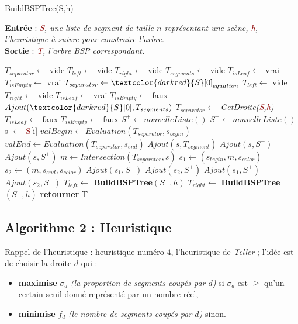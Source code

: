 \documentclass{article}
\newcommand{\red}[1]{\textcolor{darkred}{#1}}
\begin{document}
\begin{algorithm}
\caption{BuildBSPTree(S,h)}
\textbf{Entrée} : \textit{\red{S}, une liste de segment de taille $n$ représentant une scène, 
\red{h}, l'heuristique à suivre pour construire l'arbre.} \\
\textbf{Sortie} : \textit{\red{T}, l'arbre BSP correspondant.}
\begin{algorithmic}
\STATE $T_{separator} \leftarrow $ vide
\STATE $T_{left} \leftarrow $ vide
\STATE $T_{right} \leftarrow $ vide
\STATE $T_{segments} \leftarrow $ vide
\STATE $T_{isLeaf} \leftarrow $ vrai
\STATE $T_{isEmpty} \leftarrow $ vrai
\ELSE
		\STATE $T_{separator} \leftarrow \red{S}[0]_{equation}$
		\STATE $T_{left} \leftarrow$ vide
		\STATE $T_{right} \leftarrow$ vide
		\STATE $T_{isLeaf} \leftarrow$ vrai
		\STATE $T_{isEmpty} \leftarrow$ faux
		\STATE $Ajout(\red{S}[0],T_{segments})$
	\ELSE
		\STATE $T_{separator} \leftarrow$ \textit{GetDroite(\red{S},\red{h})}
		\STATE $T_{isLeaf} \leftarrow$ faux
		\STATE $T_{isEmpty} \leftarrow$ faux
		\STATE $S^+ \leftarrow nouvelleListe()$
		\STATE $S^- \leftarrow nouvelleListe()$
		\STATE s $\leftarrow$ \red{S}[i]
		\STATE $valBegin \leftarrow Evaluation(T_{separator}, s_{begin})$
		\STATE $valEnd \leftarrow Evaluation(T_{separator}, s_{end})$
			\STATE $Ajout(s,T_{segment})$
				\STATE $Ajout(s,S^-)$
			\ELSE
					\STATE $Ajout(s,S^+)$
				\ELSE
					\STATE $m \leftarrow Intersection(T_{separator},s)$
					\STATE $s_1 \leftarrow (s_{begin}, m, s_{color})$
					\STATE $s_2 \leftarrow (m,s_{end}, s_{color})$
						\STATE $Ajout(s_1,S^-)$
						\STATE $Ajout(s_2,S^+)$
					\ELSE
						\STATE $Ajout(s_1,S^+)$
						\STATE $Ajout(s_2,S^-)$
					\ENDIF
				\ENDIF
			\ENDIF
		\ENDIF
		\ENDFOR
		\STATE $T_{left} \leftarrow$ \textbf{BuildBSPTree$(S^-,h)$}
		\STATE $T_{right} \leftarrow$ \textbf{BuildBSPTree$(S^+,h)$}
		\STATE \textbf{retourner} T
	\ENDIF
\ENDIF
\end{algorithmic}
\end{algorithm}

\subsection{Algorithme 2 : Heuristique}

\noindent \underline{Rappel de l'heuristique} : heuristique numéro $4$, l'heuristique de 
\textit{Teller} ; l'idée est de choisir la droite $d$ qui :
\begin{itemize}
\item \textbf{maximise} $\sigma_d$ \textit{(la proportion de segments coupés par $d$)} si $\sigma_d$ 
est $\geq$ qu'un certain seuil donné représenté par un nombre réel,
\item \textbf{minimise} $f_d$ \textit{(le nombre de segments coupés par $d$)} sinon.
\end{itemize}
\end{document}
